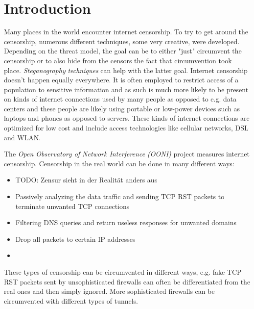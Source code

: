 
\chapter{Introduction}


Many places in the world encounter internet censorship.
To try to get around the censorship, numerous different techniques, some very creative, were developed.
Depending on the threat model, the goal can be to either "just" circumvent the censorship or to also hide from the censors the fact that circumvention took place.
\textit{Steganography} \cite{wiki:Steganography} \textit{techniques} \cite{wiki:List_of_steganography_techniques} can help with the latter goal.
Internet censorship doesn't happen equally everywhere.
It is often employed to restrict access of a population to sensitive information and as such is much more likely to be present on kinds of internet connections used by many people as opposed to e.g. data centers and these people are likely using portable or low-power devices such as laptops and phones as opposed to servers.
These kinds of internet connections are optimized for low cost and include access technologies like cellular networks, DSL and WLAN.

The \textit{Open Observatory of Network Interference (OONI)} \cite{OONI} project measures internet censorship.
Censorship in the real world can be done in many different ways:
\begin{itemize}
  \item TODO: Zensur sieht in der Realität anders aus
  \item Passively analyzing the data traffic and sending TCP RST packets to terminate unwanted TCP connections
  \item Filtering DNS queries and return useless responses for unwanted domains
  \item Drop all packets to certain IP addresses
  \item {}
\end{itemize}
These types of censorship can be circumvented in different ways, e.g. fake TCP RST packets sent by unsophisticated firewalls can often be differentiated from the real ones and then simply ignored. More sophisticated firewalls can be circumvented with different types of tunnels.

